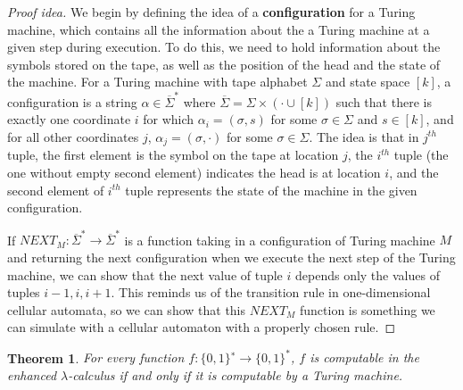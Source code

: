\documentclass[11pt]{article}
\newtheorem{theorem}{Theorem}
\theoremstyle{definition}
\theoremstyle{remark}
\begin{document}
\begin{proof}[Proof idea]
We begin by defining the idea of a \textbf{configuration} for a Turing machine, which contains all the information about the a Turing machine at a given step during execution. To do this, we need to hold information about the symbols stored on the tape, as well as the position of the head and the state of the machine. For a Turing machine with tape alphabet $\Sigma$ and state space $[k]$, a configuration is a string $\alpha \in \overline{\Sigma}^*$ where $\overline{\Sigma} = \Sigma \times \left( {\cdot} \cup [k] \right)$ such that there is exactly one coordinate $i$ for which $\alpha_i = (\sigma,s)$ for some $\sigma \in \Sigma$ and $s\in [k]$, and for all other coordinates $j$, $\alpha_j = (\sigma,\cdot)$ for some $\sigma \in \Sigma$. The idea is that in $j^{th}$ tuple, the first element is the symbol on the tape at location $j$, the $i^{th}$ tuple (the one without empty second element) indicates the head is at location $i$, and the second element of $i^{th}$ tuple represents the state of the machine in the given configuration.

If $NEXT_M: \overline{\Sigma}^* \to \overline{\Sigma}^*$ is a function taking in a configuration of Turing machine $M$ and returning the next configuration when we execute the next step of the Turing machine, we can show that the next value of tuple $i$ depends only the values of tuples $i-1, i, i+ 1$. This reminds us of the transition rule in one-dimensional cellular automata, so we can show that this $NEXT_M$ function is something we can simulate with a cellular automaton with a properly chosen rule.
\end{proof}

\begin{theorem}
For every function
$f: \{0, 1\}^∗  \to \{0, 1\}^*$, $f$ is computable in the enhanced $\lambda$-calculus if and only if it is computable by a Turing machine.
\end{theorem}
\end{document}
